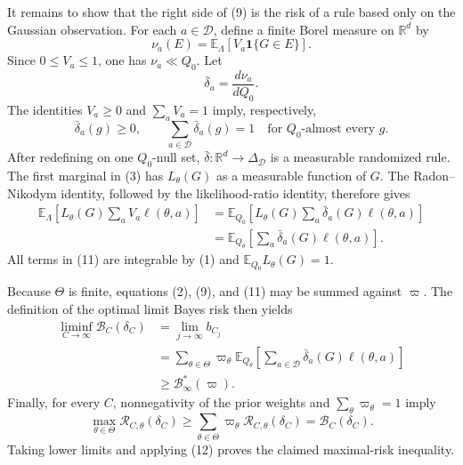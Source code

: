 It remains to show that the right side of (9) is the risk of a rule based only on the Gaussian observation.  For each \(a\in\mathcal D\), define a finite Borel measure on \(\mathbb R^d\) by
\[
 \nu_a(E)=\mathbb E_{\Lambda}\!\left[V_a\mathbf 1\{G\in E\}\right].
\]
Since \(0\leq V_a\leq1\), one has \(\nu_a\ll Q_0\).  Let
\[
 \bar\delta_a=\frac{d\nu_a}{dQ_0}.
\]
The identities \(V_a\geq0\) and \(\sum_aV_a=1\) imply, respectively,
\[
 \bar\delta_a(g)\geq0,
 \qquad
 \sum_{a\in\mathcal D}\bar\delta_a(g)=1
 \quad\text{for }Q_0\text{-almost every }g.
 \tag{10}
\]
After redefining on one \(Q_0\)-null set, \(\bar\delta\colon\mathbb R^d\to\Delta_{\mathcal D}\) is a measurable randomized rule.  The first marginal in (3) has \(L_\theta(G)\) as a measurable function of \(G\).  The Radon--Nikodym identity, followed by the likelihood-ratio identity, therefore gives
\[
 \begin{aligned}
 \mathbb E_{\Lambda}\!\left[
 L_\theta(G)\sum_aV_a\ell(\theta,a)
 \right]
 &=\mathbb E_{Q_0}\!\left[
 L_\theta(G)\sum_a\bar\delta_a(G)\ell(\theta,a)
 \right]\\
 &=\mathbb E_{Q_\theta}\!\left[
 \sum_a\bar\delta_a(G)\ell(\theta,a)
 \right].
 \end{aligned}
 \tag{11}
\]
All terms in (11) are integrable by (1) and \(\mathbb E_{Q_0}L_\theta(G)=1\).

Because \(\Theta\) is finite, equations (2), (9), and (11) may be summed against \(\varpi\).  The definition of the optimal limit Bayes risk then yields
\[
 \begin{aligned}
 \liminf_{C\to\infty}\mathcal B_C(\delta_C)
 &=\lim_{j\to\infty}b_{C_j}\\
 &=\sum_{\theta\in\Theta}\varpi_\theta
   \mathbb E_{Q_\theta}\!\left[
     \sum_{a\in\mathcal D}\bar\delta_a(G)\ell(\theta,a)
   \right]\\
 &\geq\mathcal B_\infty^*(\varpi).
 \end{aligned}
 \tag{12}
\]
Finally, for every \(C\), nonnegativity of the prior weights and \(\sum_\theta\varpi_\theta=1\) imply
\[
 \max_{\theta\in\Theta}\mathcal R_{C,\theta}(\delta_C)
 \geq\sum_{\theta\in\Theta}\varpi_\theta
       \mathcal R_{C,\theta}(\delta_C)
 =\mathcal B_C(\delta_C).
\]
Taking lower limits and applying (12) proves the claimed maximal-risk inequality.